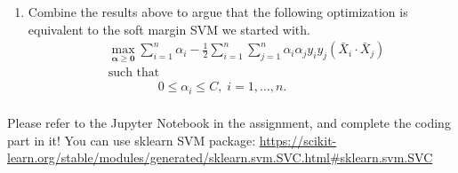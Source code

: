 \documentclass[11pt]{article}
\newenvironment{problem}[2][Problem]{\begin{trivlist}
\item[\hskip \labelsep {\bfseries #1}\hskip \labelsep {\bfseries #2.}]}{\end{trivlist}}
\begin{document}
\begin{problem}{3. (15 points)}
\begin{enumerate}
\item 
Combine the results above to argue that the following optimization is equivalent to the soft margin SVM we started with.
\begin{equation}\label{eq:soft-svm}
\begin{aligned}
&\max_{\bm{\alpha} \geq \bm{0}} \sum_{i=1}^n \alpha_i - \frac 12 \sum_{i=1}^n \sum_{j=1}^n \alpha_i\alpha_j y_iy_j(\bar X_i\cdot \bar X_j)\\
& \text{such that } \\
&\qquad\qquad0\leq\alpha_i\leq C, \; i = 1, \ldots, n.\\
\end{aligned}
\end{equation}
\end{enumerate}

\end{problem}



\begin{problem}{4 (25 points) SVM Classification}
	Please refer to the Jupyter Notebook in the assignment, and complete the coding part in it!
	You can use sklearn SVM package: \url{https://scikit-learn.org/stable/modules/generated/sklearn.svm.SVC.html#sklearn.svm.SVC}
\end{problem}
\end{document}
